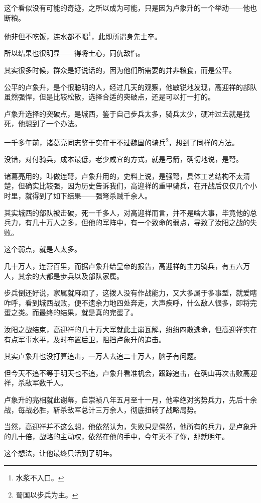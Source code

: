 \begin{multicols}{\theparacolNo}
这个看似没有可能的奇迹，之所以成为可能，只是因为卢象升的一个举动——他也断粮。

他非但不吃饭，连水都不喝\footnote{水浆不入口。}，此即所谓身先士卒。

所以结果也很明显——得将士心，同仇敌忾。

其实很多时候，群众是好说话的，因为他们所需要的并非粮食，而是公平。

公平的卢象升，是个很聪明的人，经过几天的观察，他敏锐地发现，高迎祥的部队虽然强悍，但是比较松散，选择合适的突破点，还是可以打一打的。

卢象升选择的突破点，是城西，鉴于自己步兵太多，骑兵太少，硬冲过去就是找死，他想到了一个办法。

一千多年前，诸葛亮同志鉴于实在干不过魏国的骑兵\footnote{蜀国以步兵为主。}，想到了同样的方法。

没错，对付骑兵，成本最低，老少咸宜的方式，就是弓箭，确切地说，是弩。

诸葛亮用的，叫做连弩，卢象升用的，史料上说，是强弩，具体工艺结构不太清楚，但确实比较强，因为历史告诉我们，高迎祥的重甲骑兵，在开战后仅仅几个小时里，就得到了如下结果——强弩杀贼千余人。

其实城西的部队被击破，死一千多人，对高迎祥而言，并不是啥大事，毕竟他的总兵力，有几十万人之多，但他的军阵中，有一个致命的弱点，导致了汝阳之战的失败。

这个弱点，就是人太多。

几十万人，连营百里，而据卢象升给皇帝的报告，高迎祥的主力骑兵，有五六万人，其余的大都是步兵以及部队家属。

步兵倒还好说，家属就麻烦了，这拨人没有作战能力，又大多属于多事型，就爱瞎咋呼，看到城西战败，便不遗余力地四处奔走，大声疾呼，什么敌人很多，即将完蛋之类。而最终的结果，就是真的完蛋了。

汝阳之战结束，高迎祥的几十万大军就此土崩瓦解，纷纷四散逃命，但高迎祥实在有点军事水平，及时布置后卫，阻挡卢象升的追击。

其实卢象升也没打算追击，一万人去追二十万人，脑子有问题。

但今天不追不等于明天也不追，卢象升看准机会，跟踪追击，在确山再次击败高迎祥，杀敌军数千人。

卢象升的亮相就此谢幕，自崇祯八年五月至十一月，他率绝对劣势兵力，先后十余战，每战必胜，斩杀敌军总计三万余人，彻底扭转了战略局势。

当然，高迎祥并不这么想，他依然认为，失败只是偶然，他所有的兵力，是卢象升的几十倍，战略的主动权，依然在他的手中，今年灭不了你，那就明年。

这个想法，让他最终只活到了明年。


\end{multicols}

